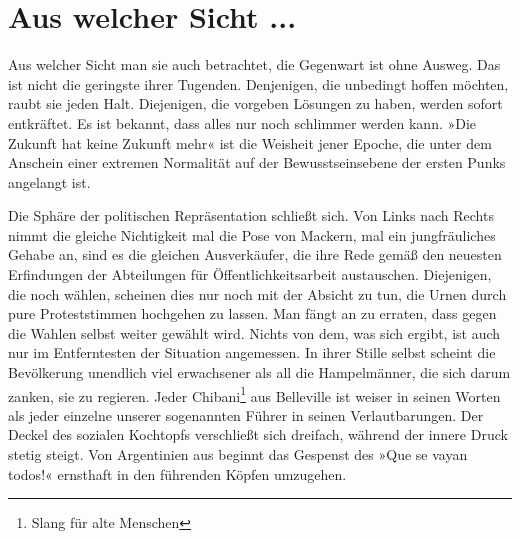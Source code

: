\tableofcontents

\section{Aus welcher Sicht ...}

Aus welcher Sicht man sie auch betrachtet, die Gegenwart ist ohne
Ausweg. Das ist nicht die geringste ihrer Tugenden. Denjenigen, die
unbedingt hoffen möchten, raubt sie jeden Halt. Diejenigen, die
vorgeben Lösungen zu haben, werden sofort entkräftet. Es ist
bekannt, dass alles nur noch schlimmer werden kann. »Die Zukunft
hat keine Zukunft mehr« ist die Weisheit jener Epoche, die unter
dem Anschein einer extremen Normalität auf der Bewusstseinsebene
der ersten Punks angelangt ist.
\extrapar{}

Die Sphäre der politischen Repräsentation schließt sich. Von Links
nach Rechts nimmt die gleiche Nichtigkeit mal die Pose von Mackern,
mal ein jungfräuliches Gehabe an, sind es die gleichen
Ausverkäufer, die ihre Rede gemäß den neuesten Erfindungen der
Abteilungen für Öffentlichkeitsarbeit austauschen. Diejenigen, die
noch wählen, scheinen dies nur noch mit der Absicht zu tun, die
Urnen durch pure Proteststimmen hochgehen zu lassen. Man fängt an
zu erraten, dass gegen die Wahlen selbst weiter gewählt wird.
Nichts von dem, was sich ergibt, ist auch nur im Entferntesten der
Situation angemessen. In ihrer Stille selbst scheint die
Bevölkerung unendlich viel erwachsener als all die Hampelmänner,
die sich darum zanken, sie zu regieren. Jeder Chibani\footnote{
Slang für alte Menschen
}
aus
Belleville ist weiser in seinen Worten als jeder einzelne unserer
sogenannten Führer in seinen Verlautbarungen. Der Deckel des
sozialen Kochtopfs verschließt sich dreifach, während der innere
Druck stetig steigt. Von Argentinien aus beginnt das Gespenst des
»Que se vayan todos!« ernsthaft in den führenden Köpfen umzugehen.
\extrapar{}

